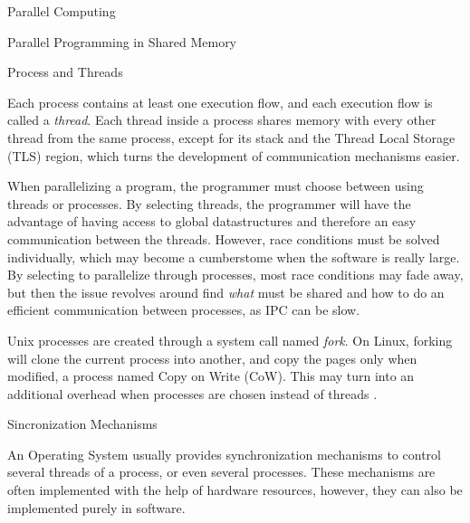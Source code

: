 \begin{section}{Parallel Computing}
\begin{subsection}{Parallel Programming in Shared Memory}
\begin{subsubsection}{Process and Threads}

Each process contains at least one execution flow, and each execution
flow is called a \textit{thread}. Each thread inside a process
shares memory with every other thread from the same process, except
for its stack and the Thread Local Storage (TLS) region, which turns
the development of communication mechanisms easier.

When parallelizing a program, the programmer must choose between
using threads or processes. By selecting threads, the programmer
will have the advantage of having access to global datastructures
and therefore an easy communication between the threads. However,
race conditions must be solved individually, which may become a
cumberstome when the software is really large. By selecting
to parallelize through processes, most race conditions may fade away,
but then the issue revolves around find \textit{what} must be shared and
how to do an efficient communication between processes, as IPC can be slow.

Unix processes are created through a system call named \textit{fork}. On
Linux, forking will clone the current process into another, and copy
the pages only when modified, a process named Copy on Write (CoW). This
may turn into an additional overhead when processes are chosen instead
of threads \citep{abbas_cow}.


\end{subsubsection}

\begin{subsubsection}{Sincronization Mechanisms}

	An Operating System usually provides synchronization mechanisms
	to control several threads of a process, or even several processes.
	These mechanisms are often implemented with the help of hardware
	resources, however, they can also be implemented purely in software.



\end{subsubsection}
\end{subsection}
\end{section}
